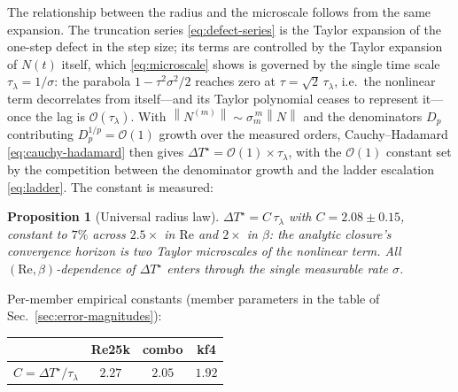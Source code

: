 \documentclass[11pt]{article}
\theoremstyle{plain}
\newtheorem{proposition}{Proposition}
\theoremstyle{definition}
\newcommand{\bO}{\mathcal{O}}
\newcommand{\DTs}{\Delta T^{\star}}
\newcommand{\taul}{\tau_{\lambda}}
\newcommand{\norm}[1]{\left\lVert #1 \right\rVert}
\begin{document}
The relationship between the radius and the microscale follows from the
same expansion. The truncation series \eqref{eq:defect-series} is the Taylor
expansion of the one-step defect in the step size; its terms are controlled
by the Taylor expansion of $N(t)$ itself, which \eqref{eq:microscale} shows
is governed by the single time scale $\taul=1/\sigma$: the parabola
$1-\tau^2\sigma^2/2$ reaches zero at $\tau=\sqrt2\,\taul$, i.e.\ the
nonlinear term decorrelates from itself---and its Taylor polynomial ceases
to represent it---once the lag is $\bO(\taul)$. With
$\norm{N^{(m)}}\sim\sigma_m^{\,m}\norm N$ and the denominators $D_p$
contributing $D_p^{1/p}=\bO(1)$ growth over the measured orders,
Cauchy--Hadamard \eqref{eq:cauchy-hadamard} then gives
$\DTs=\bO(1)\times\taul$, with the $\bO(1)$ constant set by the competition
between the denominator growth and the ladder escalation
\eqref{eq:ladder}. The constant is measured:

\begin{proposition}[Universal radius law]
\label{prop:two-micro}
$\DTs=C\,\taul$ with $C=2.08\pm0.15$, constant to $7\%$ across $2.5\times$ in
$\mathrm{Re}$ and $2\times$ in $\beta$: the analytic closure's convergence
horizon is two Taylor microscales of the nonlinear term. All
$(\mathrm{Re},\beta)$-dependence of $\DTs$ enters through the single
measurable rate $\sigma$.
\end{proposition}
\noindent Per-member empirical constants (member parameters in the table of
Sec.~\ref{sec:error-magnitudes}):
\begin{center}\small
\begin{tabular}{lccc}
\toprule
 & Re25k & combo & kf4\\
\midrule
$C=\DTs/\taul$ & $2.27$ & $2.05$ & $1.92$\\
\bottomrule
\end{tabular}
\end{center}
\end{document}
